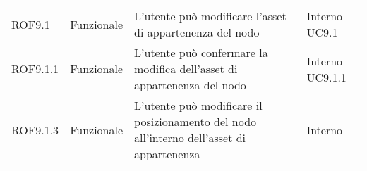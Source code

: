 \begin{longtable}{p{2cm}!{\VRule[1pt]}p{2cm}!{\VRule[1pt]}p{5cm}!{\VRule[1pt]}p{1.5cm}}
	\\
	ROF9.1                           & Funzionale\newline               & L'utente può modificare l'asset di appartenenza del nodo                                                                 & Interno \newline UC9.1       
	\\
	ROF9.1.1                         & Funzionale\newline               & L'utente può confermare la modifica dell'asset di appartenenza del nodo                                                  & Interno \newline UC9.1.1     
	\\
	ROF9.1.3                         & Funzionale\newline               & L'utente può modificare il posizionamento del nodo all'interno dell'asset di appartenenza                                & Interno                      \\


\end{longtable}
